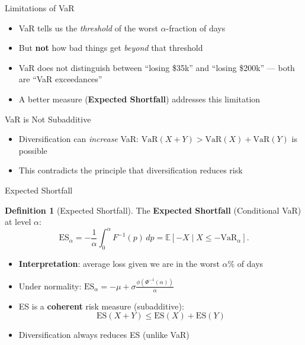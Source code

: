 \documentclass[9pt, aspectratio=169, t]{beamer}
\theoremstyle{definition}
\newtheorem{defn}{Definition}
\newcommand{\E}{\mathbb{E}}
\begin{document}
\begin{frame}{Limitations of VaR}
\begin{itemize}
\item VaR tells us the \textit{threshold} of the worst $\alpha$-fraction of days
\item But \textbf{not} how bad things get \textit{beyond} that threshold
\item VaR does not distinguish between ``losing \$35k'' and ``losing \$200k'' --- both are ``VaR exceedances''
\item A better measure (\textbf{Expected Shortfall}) addresses this limitation
\end{itemize}

\vspace{0.3cm}
\begin{alertblock}{VaR is Not Subadditive}
\begin{itemize}
\item Diversification can \textit{increase} VaR: $\text{VaR}(X+Y) > \text{VaR}(X) + \text{VaR}(Y)$ is possible
\item This contradicts the principle that diversification reduces risk
\end{itemize}
\end{alertblock}
\end{frame}

\begin{frame}{Expected Shortfall}
\begin{defn}[Expected Shortfall]
The \textbf{Expected Shortfall} (Conditional VaR) at level $\alpha$:
\[
\text{ES}_\alpha = -\frac{1}{\alpha}\int_0^\alpha F^{-1}(p)\,dp = \E[-X \mid X \leq -\text{VaR}_\alpha].
\]
\end{defn}

\begin{itemize}
\item \textbf{Interpretation}: average loss given we are in the worst $\alpha\%$ of days
\item Under normality: $\text{ES}_\alpha = -\mu + \sigma\frac{\phi(\Phi^{-1}(\alpha))}{\alpha}$
\item ES is a \textbf{coherent} risk measure (subadditive):
\[
\text{ES}(X+Y) \leq \text{ES}(X) + \text{ES}(Y)
\]
\item Diversification always reduces ES (unlike VaR)
\end{itemize}
\end{frame}
\end{document}
